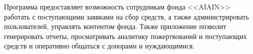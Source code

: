 Программа предоставляет возможность сотрудникам фонда <<AIAIN>> работать с поступающими заявками на сбор средств, а также администрировать пользователей, управлять контентом фонда. Также приложение позволит генерировать отчеты, просматривать аналитику пожертвований и поступающих средств и оперативно общаться с донорами и нуждающимися. 